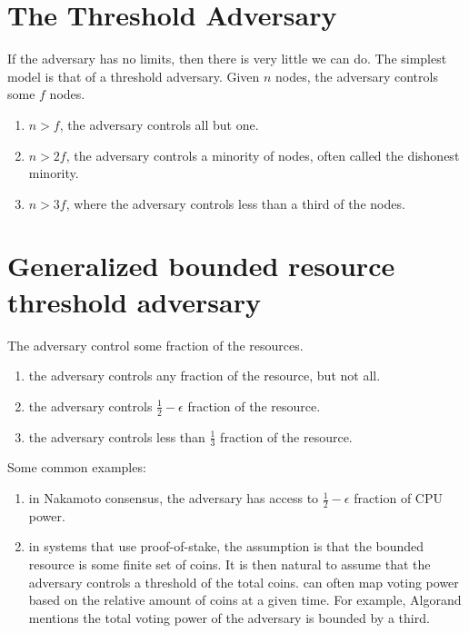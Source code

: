 \section{The Threshold Adversary}

If the adversary has no limits, then there is very little we can do.
The simplest model is that of a threshold adversary. Given $n$ nodes,
the adversary controls some $f$ nodes.
\begin{enumerate}
\item $n>f$, the adversary controls all but one.
\item $n>2f$, the adversary controls a minority of nodes, often called
the dishonest minority.
\item $n>3f$, where the adversary controls less than a third of the nodes.
\end{enumerate}
%

\section{Generalized bounded resource threshold adversary }

The adversary control some fraction of the resources.
\begin{enumerate}
\item the adversary controls any fraction of the resource, but not all.
\item the adversary controls $\frac{1}{2}-\epsilon$ fraction of the resource. 
\item the adversary controls less than $\frac{1}{3}$ fraction of the resource.
\end{enumerate}
%
Some common examples:
\begin{enumerate}
\item in Nakamoto consensus, the adversary has access to $\frac{1}{2}-\epsilon$
fraction of CPU power.
\item in systems that use proof-of-stake, the assumption is that the bounded
resource is some finite set of coins. It is then natural to assume
that the adversary controls a threshold of the total coins. can
often map voting power based on the relative amount of coins at a
given time. For example, Algorand mentions the total voting power
of the adversary is bounded by a third.
\end{enumerate}
%

